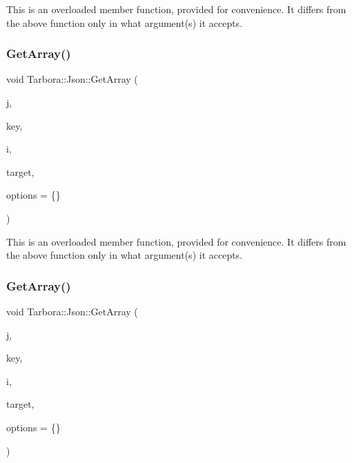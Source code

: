 This is an overloaded member function, provided for convenience. It differs from the above function only in what argument(s) it accepts. \mbox{\label{classTarbora_1_1Json_a74e452798d5d9d134c04c70cbde4e7b0}} 
\subsubsection{\texorpdfstring{Get\+Array()}{GetArray()}\hspace{0.1cm}{\footnotesize\ttfamily [9/12]}}
{\footnotesize\ttfamily void Tarbora\+::\+Json\+::\+Get\+Array (\begin{DoxyParamCaption}\item[{raw\+\_\+json}]{j,  }\item[{const char $\ast$}]{key,  }\item[{int}]{i,  }\item[{int $\ast$}]{target,  }\item[{\hyperlink{structTarbora_1_1JsonOptions}{Json\+Options}}]{options = {\ttfamily \{\}} }\end{DoxyParamCaption})}

This is an overloaded member function, provided for convenience. It differs from the above function only in what argument(s) it accepts. \mbox{\label{classTarbora_1_1Json_a41297480bdcb44440a971721252d738f}} 
\subsubsection{\texorpdfstring{Get\+Array()}{GetArray()}\hspace{0.1cm}{\footnotesize\ttfamily [10/12]}}
{\footnotesize\ttfamily void Tarbora\+::\+Json\+::\+Get\+Array (\begin{DoxyParamCaption}\item[{raw\+\_\+json}]{j,  }\item[{const char $\ast$}]{key,  }\item[{int}]{i,  }\item[{float $\ast$}]{target,  }\item[{\hyperlink{structTarbora_1_1JsonOptions}{Json\+Options}}]{options = {\ttfamily \{\}} }\end{DoxyParamCaption})}

